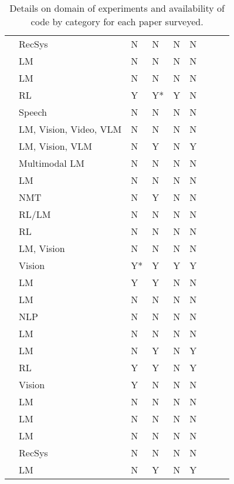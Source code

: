 \begin{table}[!htp]
{\begin{tabular}{lllllllll}
\cite{shin2023scaling} & RecSys & N & N & N & N \\
\cite{hernandez2022scaling} & LM & N & N & N & N \\
\cite{filipovich2022scaling} & LM & N & N & N & N \\
\cite{neumann2022scaling} & RL & Y & Y* & Y & N \\
\cite{droppo2021scaling} & Speech & N & N & N & N \\
\cite{henighan2020scaling} & LM, Vision, Video, VLM & N & N & N & N \\
\cite{goyal2024scaling} & LM, Vision, VLM & N & Y & N & Y \\
\cite{aghajanyan2023scaling} & Multimodal LM & N & N & N & N \\
\cite{kaplan2020scaling} & LM & N & N & N & N \\
\cite{ghorbani2021scaling} & NMT & N & Y & N & N \\
\cite{gao2023scaling} & RL/LM & N & N & N & N \\
\cite{hilton2023scaling} & RL & N & N & N & N \\
\cite{frantar2023scaling} & LM, Vision & N & N & N & N \\
\cite{prato2021scaling} & Vision & Y* & Y & Y & Y \\
\cite{covert2024scaling} & LM & Y & Y & N & N \\
\cite{hernandez2021scaling} & LM & N & N & N & N \\
\cite{ivgi2022scaling} & NLP & N & N & N & N \\
\cite{tay2022scaling} & LM & N & N & N & N \\
\cite{tao2024scaling} & LM & N & Y & N & Y \\
\cite{jones2021scaling} & RL & Y & Y & N & Y \\
\cite{zhai2022scaling} & Vision & Y & N & N & N \\
\cite{dettmers2023case} & LM & N & N & N & N \\
\cite{dubey2024llama} & LM & N & N & N & N \\
\cite{hoffmann2022training} & LM & N & N & N & N \\
\cite{ardalani2022understanding} & RecSys & N & N & N & N \\
\cite{clark2022unified} & LM & N & Y & N & Y \\
\bottomrule
\end{tabular}
}

\caption{Details on domain of experiments and availability of code by category for each paper surveyed.}
\label{tab:full-basic}
\end{table}

